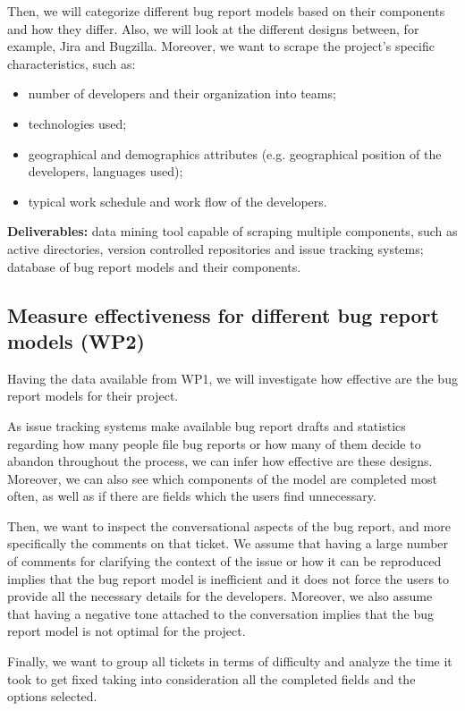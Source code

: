 \documentclass[11pt,english,twocolumn]{article}
\begin{document}
Then, we will categorize different bug report models based on their components and how
they differ. Also, we will look at the different designs between, for example, Jira and Bugzilla.
Moreover, we want to scrape the project's specific characteristics, such as:
	\begin{itemize}
		\item number of developers and their organization into teams;
		\item technologies used;
		\item geographical and demographics attributes (e.g. geographical position of the 
		developers, languages used);
		\item typical work schedule and work flow of the developers.
	\end{itemize}
\textbf{Deliverables:} data mining tool capable of scraping multiple components, such as 
active directories, version controlled repositories and issue tracking systems; database of
bug report models and their components.

\subsection*{Measure effectiveness for different bug report models (WP2)}

Having the data available from WP1, we will investigate how effective are the bug report
models for their project. 

As issue tracking systems make available bug report drafts and 
statistics regarding how many people file bug reports or how many of them decide to abandon
throughout the process, we can infer how effective are these designs. Moreover, we can also 
see which components of the model are completed most often, as well as if there are fields 
which the users find unnecessary.

Then, we want to inspect the conversational aspects of the bug report, and more specifically 
the comments on that ticket. We assume that having a large number of comments for clarifying
the context of the issue or how it can be reproduced implies that the bug report model is 
inefficient and it does not force the users to provide all the necessary details for the developers.
Moreover, we also assume that having a negative tone attached to the conversation implies that 
the bug report model is not optimal for the project.

Finally, we want to group all tickets in terms of difficulty and analyze the time it took to 
get fixed taking into consideration all the completed fields and the options selected. 
\end{document}
